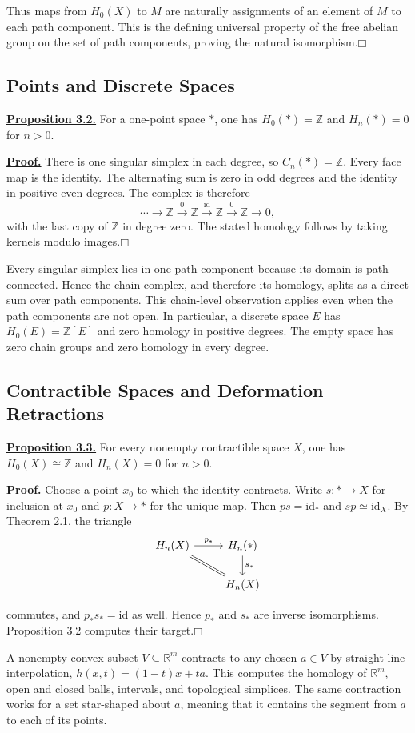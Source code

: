 \documentclass[11pt]{article}
\newcommand{\coursebold}[1]{{\color{burgundy}\textbf{#1}}}
\newcommand{\facehead}[1]{\subsection{#1}}
\begin{document}
Thus maps from $H_0(X)$ to $M$ are naturally assignments of an element of $M$ to each path component. This is the defining universal property of the free abelian group on the set of path components, proving the natural isomorphism.\hfill$\mdlgwhtsquare$

\facehead{Points and Discrete Spaces}
\hypertarget{prop22}{}\coursebold{\hyperlink{proof22}{Proposition 3.2.}} For a one-point space $*$, one has $H_0(*)=\mathbb Z$ and $H_n(*)=0$ for $n>0$.

\hypertarget{proof22}{}\coursebold{\hyperlink{prop22}{Proof.}} There is one singular simplex in each degree, so $C_n(*)=\mathbb Z$. Every face map is the identity. The alternating sum is zero in odd degrees and the identity in positive even degrees. The complex is therefore
\[\cdots\longrightarrow\mathbb Z\xrightarrow{0}\mathbb Z\xrightarrow{\mathrm{id}}\mathbb Z\xrightarrow{0}\mathbb Z\longrightarrow0,\]
with the last copy of $\mathbb Z$ in degree zero. The stated homology follows by taking kernels modulo images.\hfill$\mdlgwhtsquare$

Every singular simplex lies in one path component because its domain is path connected. Hence the chain complex, and therefore its homology, splits as a direct sum over path components. This chain-level observation applies even when the path components are not open. In particular, a discrete space $E$ has $H_0(E)=\mathbb Z[E]$ and zero homology in positive degrees. The empty space has zero chain groups and zero homology in every degree.

\facehead{Contractible Spaces and Deformation Retractions}
\hypertarget{prop23}{}\coursebold{\hyperlink{proof23}{Proposition 3.3.}} For every nonempty contractible space $X$, one has $H_0(X)\cong\mathbb Z$ and $H_n(X)=0$ for $n>0$.

\hypertarget{proof23}{}\coursebold{\hyperlink{prop23}{Proof.}} Choose a point $x_0$ to which the identity contracts. Write $s:*\to X$ for inclusion at $x_0$ and $p:X\to *$ for the unique map. Then $ps=\mathrm{id}_*$ and $sp\simeq\mathrm{id}_X$. By Theorem 2.1, the triangle
\[
\begin{tikzcd}
H_n(X)\arrow[r,"p_*"]\arrow[dr,equal]&H_n(*)\arrow[d,"s_*"]\\
&H_n(X)
\end{tikzcd}
\]

commutes, and $p_*s_*=\mathrm{id}$ as well. Hence $p_*$ and $s_*$ are inverse isomorphisms. Proposition 3.2 computes their target.\hfill$\mdlgwhtsquare$

A nonempty convex subset $V\subseteq\mathbb R^m$ contracts to any chosen $a\in V$ by straight-line interpolation, $h(x,t)=(1-t)x+ta$. This computes the homology of $\mathbb R^m$, open and closed balls, intervals, and topological simplices. The same contraction works for a set star-shaped about $a$, meaning that it contains the segment from $a$ to each of its points.
\end{document}
